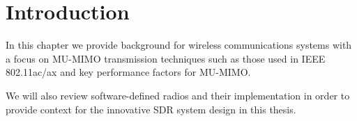 \section{Introduction}
\label{sec:background}

In this chapter we provide background for wireless communications systems with a focus on \ac{MU-MIMO} transmission techniques such as those used in \ac{IEEE} 802.11ac/ax and key performance factors for \ac{MU-MIMO}.

We will also review software-defined radios and their implementation in order to provide context for the innovative \ac{SDR} system design in this thesis.


%
%
%
%
%
%
%

